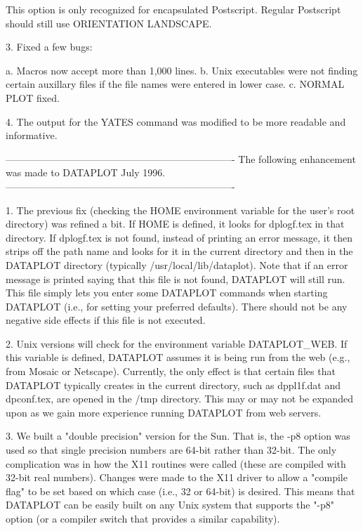 {    This option is only recognized for encapsulated Postscript.
    Regular Postscript should still use ORIENTATION LANDSCAPE.

 3. Fixed a few bugs:

    a. Macros now accept more than 1,000 lines.
    b. Unix executables were not finding certain auxillary files
       if the file names were entered in lower case.
    c. NORMAL PLOT fixed.

 4. The output for the YATES command was modified to be more readable
    and informative.

----------------------------------------------------------------------
The following enhancement was made to DATAPLOT July              1996.
----------------------------------------------------------------------

 1. The previous fix (checking the HOME environment variable for the
    user's root directory) was refined a bit.  If HOME is defined,
    it looks for dplogf.tex in that directory.  If dplogf.tex is
    not found, instead of printing an error message, it then strips
    off the path name and looks for it in the current directory and
    then in the DATAPLOT directory (typically /usr/local/lib/dataplot).
    Note that if an error message is printed saying that this file is
    not found, DATAPLOT will still run.  This file simply lets you
    enter some DATAPLOT commands when starting DATAPLOT (i.e., for
    setting your preferred defaults).  There should not be any
    negative side effects if this file is not executed.

 2. Unix versions will check for the environment variable
    DATAPLOT_WEB.  If this variable is defined, DATAPLOT assumes it
    is being run from the web (e.g., from Mosaic or Netscape).
    Currently, the only effect is that certain files that DATAPLOT
    typically creates in the current directory, such as dppl1f.dat
    and dpconf.tex, are opened in the /tmp directory.  This may or
    may not be expanded upon as we gain more experience running
    DATAPLOT from web servers.

 3. We built a "double precision" version for the Sun.  That is,
    the -p8 option was used so that single precision numbers are
    64-bit rather than 32-bit.  The only complication was in how the
    X11 routines were called (these are compiled with 32-bit real
    numbers).  Changes were made to the X11 driver to allow a
    "compile flag" to be set based on which case (i.e., 32 or 64-bit)
    is desired.  This means that DATAPLOT can be easily built on any
    Unix system that supports the "-p8" option (or a compiler switch
    that provides a similar capability).

}
